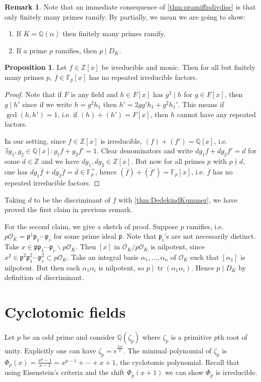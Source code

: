 \documentclass{article}
\newcommand{\Z}{\mathbb{Z}}
\newcommand{\Q}{\mathbb{Q}}
\newcommand{\F}{\mathbb{F}}
\newcommand{\tr}{\operatorname{tr}}
\newcommand{\ri}{\mathcal{O}}
\newcommand{\ip}{\mathfrak{p}}
\theoremstyle{definition}
\newtheorem{prop}[defn]{Proposition}
\newtheorem{remark}[defn]{Remark}
\begin{document}
\begin{remark}
Note that an immediate consequence of \ref{thm:pramiffpdivdisc} is that only finitely many primes ramify. By partially, we mean we are going to show:
\begin{enumerate}
\item If $K=\Q(\alpha)$ then finitely many primes ramify.
\item If a prime $p$ ramifies, then $p\mid D_K$.
\end{enumerate}
\end{remark}

\begin{prop}
Let $f\in\Z[x]$ be irreducible and monic. Then for all but finitely many primes $p$, $\overline f\in\F_p[x]$ has no repeated irreducible factors.
\end{prop}
\begin{proof}
Note that if $F$ is any field and $h\in F[x]$ has $g^2\mid h$ for $g\in F[x]$, then $g\mid h'$ since if we write $h=g^2h_1$ then $h'=2gg'h_1+g^2h_1'$. This means if $\gcd (h,h')=1$, i.e. if $(h)+(h')=F[x]$, then $h$ cannot have any repeated factors.

In our setting, since $f\in\Z[x]$ is irreducible, $(f)+(f')=\Q[x]$, i.e. $\exists g_1,g_2\in\Q[x]:g_1f+g_2f'=1$. Clear denominators and write $dg_1f+dg_2f'=d$ for some $d\in\Z$ and we have $dg_1,dg_2\in\Z[x]$. But now for all primes $p$ with $p\nmid d$, one has $\overline{dg_1}\overline{f}+\overline{dg_2}\overline{f}=\overline{d}\in\F_p^\times$, hence $(\overline f)+(\overline f')=\F_p[x]$, i.e. $\overline f$ has no repeated irreducible factors.
\end{proof}
Taking $d$ to be the discriminant of $f$ with \ref{thm:DedekindKummer}, we have proved the first claim in previous remark.

For the second claim, we give a sketch of proof. Suppose $p$ ramifies, i.e. $p\ri_K=\ip^1\ip_1\cdots\ip_r$ for some prime ideal $\ip$. Note that $\ip_i$'s are not necessarily distinct. Take $x\in\ip\ip_1\cdots\ip_r\backslash p\ri_K$. Then $[x]$ in $\ri_K/p\ri_K$ is nilpotent, since $x^2\in\ip^2\ip_1^2\cdots\ip_r^2\subset p\ri_K$. Take an integral basis $\alpha_1,\ldots,\alpha_n$ of $\ri_K$ such that $[\alpha_1]$ is nilpotent. But then each $\alpha_1\alpha_i$ is nilpotent, so $p\mid\tr(\alpha_1\alpha_i)$. Hence $p\mid D_K$ by definition of discriminant.

\section{Cyclotomic fields}
Let $p$ be an odd prime and consider $\Q(\zeta_p)$ where $\zeta_p$ is a primitive $p$th root of unity. Explicitly one can have $\zeta_p=e^{\frac{2\pi i}{p}}$. The minimal polynomial of $\zeta_p$ is $\Phi_p(x)=\frac{x^p-1}{x-1}=x^{p-1}+\cdots+x+1$, the cyclotomic polynomial. Recall that using Eisenstein's criteria and the shift $\Phi_p(x+1)$ we can show $\Phi_p$ is irreducible.
\end{document}
